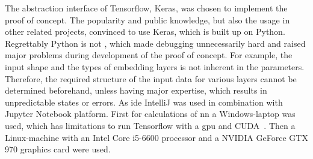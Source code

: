 The abstraction interface of Tensorflow, Keras, was chosen to implement the proof of concept.
The popularity and public knowledge, but also the usage in other related projects, convinced to use Keras, which is built up on Python.
Regrettably Python is not , which made debugging unnecessarily hard and raised major problems during development of the proof of concept.
For example, the input shape and the types of embedding layers is not inherent in the parameters.
Therefore, the required structure of the input data for various layers cannot be determined beforehand, unless having major expertise, which results in unpredictable states or errors.
As \gls{ide} IntelliJ was used in combination with Jupyter Notebook platform.
First for calculations of \gls{nn} a Windows-laptop was used, which has limitations to run Tensorflow with a \gls{gpu} and CUDA~\cite{tensorflowGpuWindows}.
Then a Linux-machine with an Intel Core i5-6600 processor and a NVIDIA GeForce GTX 970 graphics card were used.

%







